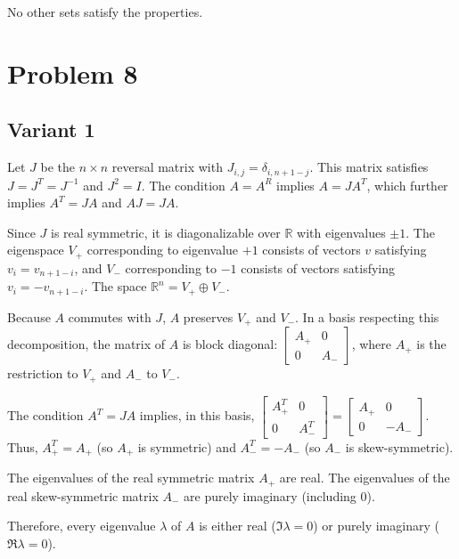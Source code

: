 \documentclass[12pt,a4paper]{article}
\theoremstyle{definition}
\begin{document}
    No other sets satisfy the properties.

  \section{Problem 8}
\subsection{Variant 1}
    Let $J$ be the $n \times n$ reversal matrix with $J_{i,j} = \delta_{i, n+1-j}$. This matrix satisfies $J = J^T = J^{-1}$ and $J^2 = I$. The condition $A = A^R$ implies $A = J A^T$, which further implies $A^T = J A$ and $A J = J A$.

    Since $J$ is real symmetric, it is diagonalizable over $\mathbb{R}$ with eigenvalues $\pm 1$. The eigenspace $V_+$ corresponding to eigenvalue $+1$ consists of vectors $v$ satisfying $v_i = v_{n+1-i}$, and $V_-$ corresponding to $-1$ consists of vectors satisfying $v_i = -v_{n+1-i}$. The space $\mathbb{R}^n = V_+ \oplus V_-$.

    Because $A$ commutes with $J$, $A$ preserves $V_+$ and $V_-$. In a basis respecting this decomposition, the matrix of $A$ is block diagonal: $\begin{bmatrix} A_+ & 0 \\ 0 & A_- \end{bmatrix}$, where $A_+$ is the restriction to $V_+$ and $A_-$ to $V_-$.

    The condition $A^T = J A$ implies, in this basis, $\begin{bmatrix} A_+^T & 0 \\ 0 & A_-^T \end{bmatrix} = \begin{bmatrix} A_+ & 0 \\ 0 & -A_- \end{bmatrix}$. Thus, $A_+^T = A_+$ (so $A_+$ is symmetric) and $A_-^T = -A_-$ (so $A_-$ is skew-symmetric).

    The eigenvalues of the real symmetric matrix $A_+$ are real. The eigenvalues of the real skew-symmetric matrix $A_-$ are purely imaginary (including 0).

    Therefore, every eigenvalue $\lambda$ of $A$ is either real ($\Im \lambda = 0$) or purely imaginary ($\Re \lambda = 0$).

\end{document}

